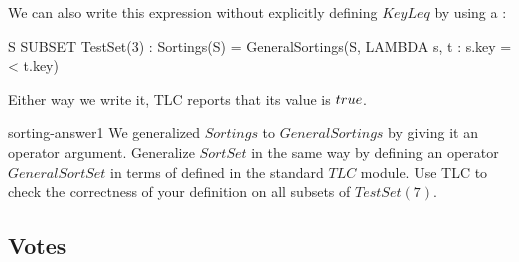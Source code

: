 \documentclass[fleqn,leqno]{article}
\begin{document}
We can also write this expression without explicitly defining $KeyLeq$
by using a 
:
\begin{widedisplay}
\begin{notla}
\A S \in SUBSET TestSet(3) : 
    Sortings(S) = GeneralSortings(S,  LAMBDA s, t : s.key =< t.key)
\end{notla}
\begin{tlatex}
%
\end{tlatex}
\end{widedisplay}
Either way we write it, TLC reports that its value is $\TRUE$.

\begin{aquestion}{sorting-answer1}
We generalized $Sortings$ to $GeneralSortings$ by giving it an operator
argument.  Generalize $SortSet$ in the same way
by defining an operator $GeneralSortSet$ in terms of 
defined in the standard $TLC$ module.  Use TLC to check the
correctness of your definition on all subsets of $TestSet(7)$.
\end{aquestion}



\subsection{Votes}
\end{document}
